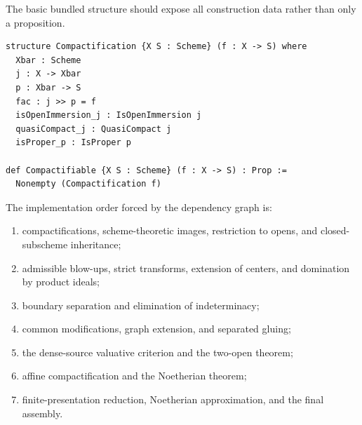 The basic bundled structure should expose all construction data rather than
only a proposition.

\begin{verbatim}
structure Compactification {X S : Scheme} (f : X -> S) where
  Xbar : Scheme
  j : X -> Xbar
  p : Xbar -> S
  fac : j >> p = f
  isOpenImmersion_j : IsOpenImmersion j
  quasiCompact_j : QuasiCompact j
  isProper_p : IsProper p

def Compactifiable {X S : Scheme} (f : X -> S) : Prop :=
  Nonempty (Compactification f)
\end{verbatim}

The implementation order forced by the dependency graph is:
\begin{enumerate}
  \item compactifications, scheme-theoretic images, restriction to opens, and
    closed-subscheme inheritance;
  \item admissible blow-ups, strict transforms, extension of centers, and
    domination by product ideals;
  \item boundary separation and elimination of indeterminacy;
  \item common modifications, graph extension, and separated gluing;
  \item the dense-source valuative criterion and the two-open theorem;
  \item affine compactification and the Noetherian theorem;
  \item finite-presentation reduction, Noetherian approximation, and the final
    assembly.
\end{enumerate}

